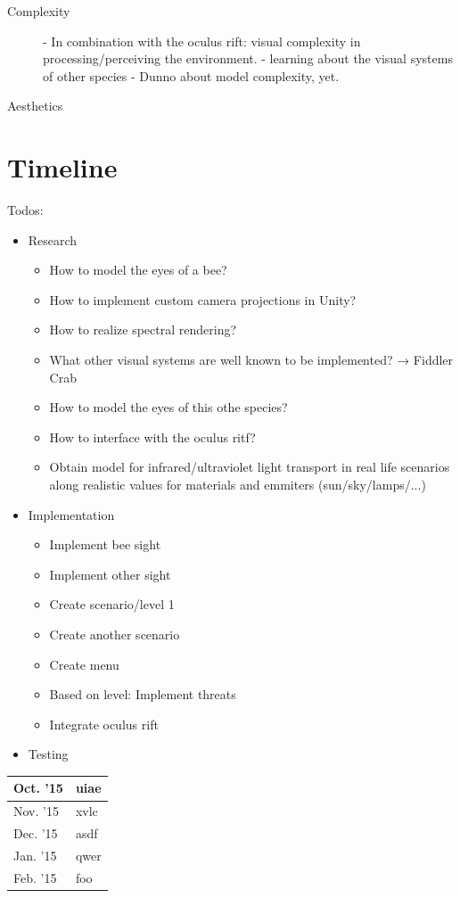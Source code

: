 \documentclass{acm_proc_article-sp}
\begin{document}
\begin{description}
\item[Complexity]
- In combination with the oculus rift: visual complexity in
  processing/perceiving the environment.
- learning about the visual systems of other species
- Dunno about model complexity, yet.

\item[Aesthetics]
\end{description}

\section{Timeline}

Todos:
\begin{itemize}
  \item Research
  \begin{itemize}
    \item How to model the eyes of a bee?
    \item How to implement custom camera projections in Unity?
    \item How to realize spectral rendering?
    \item What other visual systems are well known to be implemented? → Fiddler Crab
    \item How to model the eyes of this othe species?
    \item How to interface with the oculus ritf?
    \item Obtain model for infrared/ultraviolet light transport in real life
          scenarios along realistic values for materials and emmiters (sun/sky/lamps/...)
  \end{itemize}
  \item Implementation
  \begin{itemize}
    \item Implement bee sight
    \item Implement other sight
    \item Create scenario/level 1
    \item Create another scenario
    \item Create menu
    \item Based on level: Implement threats
    \item Integrate oculus rift
  \end{itemize}
  \item Testing
\end{itemize}

\begin{center}
  \begin{tabular}{|l|p{6.5cm}|}
    \hline
    Oct. '15 & uiae \\ \hline
    Nov. '15 & xvlc \\ \hline
    Dec. '15 & asdf \\ \hline
    Jan. '15 & qwer \\ \hline
    Feb. '15 & foo \\
    \hline
  \end{tabular}
\end{center}

\printbibliography

\balancecolumns
\end{document}
